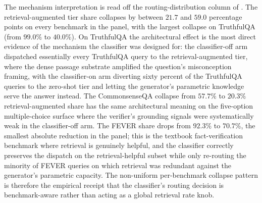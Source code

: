 The mechanism interpretation is read off the routing-distribution column of . The retrieval-augmented tier share collapses by between $21.7$ and $59.0$ percentage points on every benchmark in the panel, with the largest collapse on TruthfulQA (from $99.0\%$ to $40.0\%$). On TruthfulQA the architectural effect is the most direct evidence of the mechanism the classifier was designed for: the classifier-off arm dispatched essentially every TruthfulQA query to the retrieval-augmented tier, where the dense passage substrate amplified the question's misconception framing, with the classifier-on arm diverting sixty percent of the TruthfulQA queries to the zero-shot tier and letting the generator's parametric knowledge serve the answer instead. The CommonsenseQA collapse from $57.7\%$ to $20.3\%$ retrieval-augmented share has the same architectural meaning on the five-option multiple-choice surface where the verifier's grounding signals were systematically weak in the classifier-off arm. The FEVER share drops from $92.3\%$ to $70.7\%$, the smallest absolute reduction in the panel; this is the textbook fact-verification benchmark where retrieval is genuinely helpful, and the classifier correctly preserves the dispatch on the retrieval-helpful subset while only re-routing the minority of FEVER queries on which retrieval was redundant against the generator's parametric capacity. The non-uniform per-benchmark collapse pattern is therefore the empirical receipt that the classifier's routing decision is benchmark-aware rather than acting as a global retrieval rate knob.

